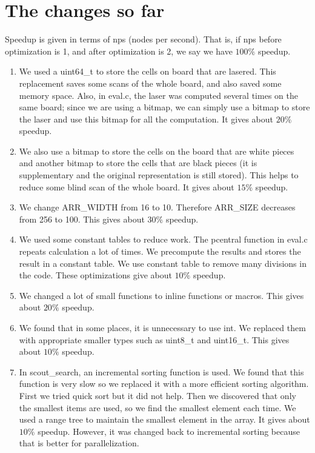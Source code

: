\documentclass[10pt,twosidep]{article}
\begin{document}
\section{The changes so far}
Speedup is given in terms of nps (nodes per second). That is, if nps before optimization is 1, and after optimization is 2, we say we have $100\%$ speedup.
\begin{enumerate}
  \item We used a uint64\_t to store the cells on board that are lasered. This replacement saves some scans of the whole board, and also saved some memory space. Also, in eval.c, the laser was computed several times on the same board; since we are using a bitmap, we can simply use a bitmap to store the laser and use this bitmap for all the computation. It gives about $20\%$ speedup.
  \item We also use a bitmap to store the cells on the board that are white pieces and another bitmap to store the cells that are black pieces (it is supplementary and the original representation is still stored). This helps to reduce some blind scan of the whole board.  It gives about $15\%$ speedup.
  \item We change ARR\_WIDTH from 16 to 10. Therefore ARR\_SIZE decreases from 256 to 100. This gives about $30\%$ speedup.
  \item We used some constant tables to reduce work. 
  The pcentral function in eval.c repeats calculation a lot of times. We precompute the results and stores the result in a constant table.
  We use constant table to remove many divisions in the code.
  These optimizations give about $10\%$ speedup.
  \item We changed a lot of small functions to inline functions or macros. This gives about $20\%$ speedup.
  \item We found that in some places, it is unnecessary to use int. We replaced them with appropriate smaller types such as uint8\_t and uint16\_t. This gives about $10\%$ speedup.
  \item In scout\_search, an incremental sorting function is used. We found that this function is very slow so we replaced it with a more efficient sorting algorithm. First we tried quick sort but it did not help. Then we discovered that only the smallest items are used, so we find the smallest element each time. We used a range tree to maintain the smallest element in the array. It gives about $10\%$ speedup. However, it was changed back to incremental sorting because that is better for parallelization. 

\end{enumerate}
\end{document}
